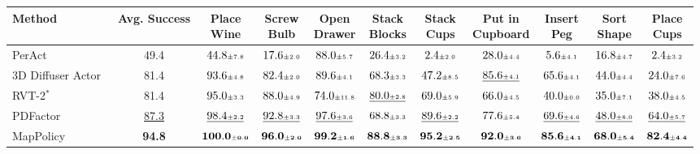 \begin{table}[t]
\begin{adjustbox}{max width=\textwidth}
\begin{tabular}{l|c|ccccccccc}
\toprule
\rowcolor{tablehead}
Method & Avg. Success &
\shortstack{Place\\Wine} &
\shortstack{Screw\\Bulb} &
\shortstack{Open\\Drawer} &
\shortstack{Stack\\Blocks} &
\shortstack{Stack\\Cups} &
\shortstack{Put in\\Cupboard} &
\shortstack{Insert\\Peg} &
\shortstack{Sort\\Shape} &
\shortstack{Place\\Cups} \\
\midrule
PerAct~\cite{shridhar2022peract} & 49.4 & $44.8{\scriptscriptstyle\pm 7.8}$ & $17.6{\scriptscriptstyle\pm 2.0}$ & $88.0{\scriptscriptstyle\pm 5.7}$ & $26.4{\scriptscriptstyle\pm 3.2}$ & $2.4{\scriptscriptstyle\pm 2.0}$ & $28.0{\scriptscriptstyle\pm 4.4}$ & $5.6{\scriptscriptstyle\pm 4.1}$ & $16.8{\scriptscriptstyle\pm 4.7}$ & $2.4{\scriptscriptstyle\pm 3.2}$ \\
3D Diffuser Actor~\cite{3d_diffuser_actor} & 81.4 & $93.6{\scriptscriptstyle\pm 4.8}$ & $82.4{\scriptscriptstyle\pm 2.0}$ & $89.6{\scriptscriptstyle\pm 4.1}$ & $68.3{\scriptscriptstyle\pm 3.3}$ & $47.2{\scriptscriptstyle\pm 8.5}$ & $\underline{85.6{\scriptscriptstyle\pm 4.1}}$ & $65.6{\scriptscriptstyle\pm 4.1}$ & $44.0{\scriptscriptstyle\pm 4.4}$ & $24.0{\scriptscriptstyle\pm 7.6}$ \\
RVT-2$^\ast$~\cite{goyal2024rvt2} & 81.4 & $95.0{\scriptscriptstyle\pm 3.3}$ & $88.0{\scriptscriptstyle\pm 4.9}$ & $74.0{\scriptscriptstyle\pm 11.8}$ & $\underline{80.0{\scriptscriptstyle\pm 2.8}}$ & $69.0{\scriptscriptstyle\pm 5.9}$ & $66.0{\scriptscriptstyle\pm 4.5}$ & $40.0{\scriptscriptstyle\pm 0.0}$ & $35.0{\scriptscriptstyle\pm 7.1}$ & $38.0{\scriptscriptstyle\pm 4.5}$ \\
PDFactor~\cite{Tian_2025_CVPR} & \underline{87.3} & $\underline{98.4{\scriptscriptstyle\pm 2.2}}$ & $\underline{92.8{\scriptscriptstyle\pm 3.3}}$ & $\underline{97.6{\scriptscriptstyle\pm 3.6}}$ & $68.8{\scriptscriptstyle\pm 3.3}$ & $\underline{89.6{\scriptscriptstyle\pm 2.2}}$ & $77.6{\scriptscriptstyle\pm 5.4}$ & $\underline{69.6{\scriptscriptstyle\pm 4.6}}$ & $\underline{48.0{\scriptscriptstyle\pm 8.0}}$ & $\underline{64.0{\scriptscriptstyle\pm 5.7}}$ \\
\midrule
MapPolicy & \textbf{94.8} & $\mathbf{100.0{\scriptscriptstyle\pm 0.0}}$ & $\mathbf{96.0{\scriptscriptstyle\pm 2.0}}$ & $\mathbf{99.2{\scriptscriptstyle\pm 1.6}}$ & $\mathbf{88.8{\scriptscriptstyle\pm 3.3}}$ & $\mathbf{95.2{\scriptscriptstyle\pm 2.5}}$ & $\mathbf{92.0{\scriptscriptstyle\pm 3.6}}$ & $\mathbf{85.6{\scriptscriptstyle\pm 4.1}}$ & $\mathbf{68.0{\scriptscriptstyle\pm 5.4}}$ & $\mathbf{82.4{\scriptscriptstyle\pm 4.4}}$ \\
\bottomrule
\end{tabular}
\end{adjustbox}
\end{table}
